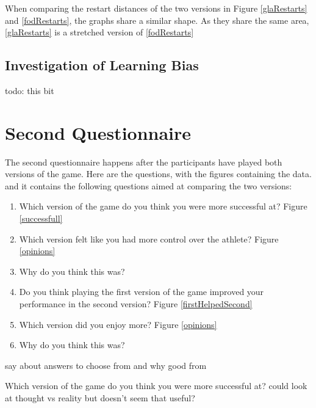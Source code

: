 \documentclass[12pt,a4paper,twoside,openright]{report}
\begin{document}

When comparing the restart distances of the two versions in Figure \ref{glaRestarts} and \ref{fodRestarts}, the graphs share a similar shape. As they share the same area, \ref{glaRestarts} is a stretched version of \ref{fodRestarts}

\subsection{Investigation of Learning Bias}

todo: this bit


\section{Second Questionnaire}
\label{q2}

The second questionnaire happens after the participants have played both versions of the game.
Here are the questions, with the figures containing the data.
and it contains the following questions aimed at comparing the two versions:

\begin{enumerate}
	\item Which version of the game do you think you were more successful at? Figure \ref{successfull}
	\item Which version felt like you had more control over the athlete? Figure \ref{opinions}
	\item Why do you think this was?
	\item Do you think playing the first version of the game improved your performance in the second version? Figure \ref{firstHelpedSecond}
	\item Which version did you enjoy more? Figure \ref{opinions}
	\item Why do you think this was?
\end{enumerate}

say about answers to choose from and why good from

Which version of the game do you think you were more successful at?
could look at thought vs reality but doesn't seem that useful?
\end{document}
